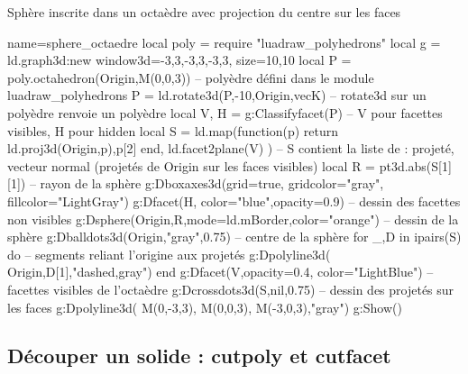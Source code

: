 \begin{itemize}
\begin{demo}{Sphère inscrite dans un octaèdre avec projection du centre sur les faces}
\begin{luadraw}{name=sphere_octaedre}
local poly = require "luadraw_polyhedrons"
local g = ld.graph3d:new{ window3d={-3,3,-3,3,-3,3}, size={10,10}}
local P = poly.octahedron(Origin,M(0,0,3)) -- polyèdre défini dans le module luadraw_polyhedrons
P = ld.rotate3d(P,-10,{Origin,vecK}) -- rotate3d sur un polyèdre renvoie un polyèdre
local V, H = g:Classifyfacet(P) -- V pour facettes visibles, H pour hidden
local S = ld.map(function(p) return {ld.proj3d(Origin,p),p[2]} end, ld.facet2plane(V) )
-- S contient la liste de : {projeté, vecteur normal} (projetés de Origin sur les faces visibles)
local R = pt3d.abs(S[1][1]) -- rayon de la sphère
g:Dboxaxes3d({grid=true, gridcolor="gray", fillcolor="LightGray"})
g:Dfacet(H, {color="blue",opacity=0.9}) -- dessin des facettes non visibles
g:Dsphere(Origin,R,{mode=ld.mBorder,color="orange"}) -- dessin de la sphère
g:Dballdots3d(Origin,"gray",0.75) -- centre de la sphère
for _,D in ipairs(S) do -- segments reliant l'origine aux projetés
    g:Dpolyline3d( {Origin,D[1]},"dashed,gray")
end
g:Dfacet(V,{opacity=0.4, color="LightBlue"}) -- facettes visibles de l'octaèdre
g:Dcrossdots3d(S,nil,0.75) -- dessin des projetés sur les faces
g:Dpolyline3d( {M(0,-3,3), M(0,0,3), M(-3,0,3)},"gray")
g:Show()
\end{luadraw}
\end{demo}
\end{itemize}

\subsection{Découper un solide : cutpoly et cutfacet}


